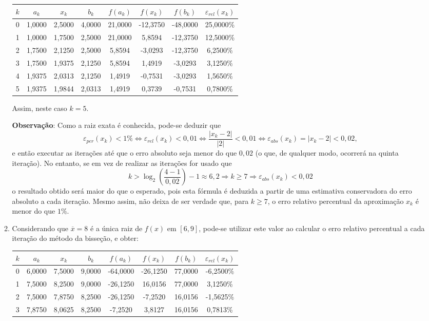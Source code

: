 \documentclass[12pt,a4paper]{article}
\begin{document}
\begin{enumerate}
\begin{enumerate}
\begin{tabular}{cccccccc}
\hline
$k$ & $a_k$ & $x_k$ & $b_k$ & $f(a_k)$ & $f(x_k)$ & $f(b_k)$ & $\varepsilon_{rel}(x_k)$ \\
\hline
0 & 1,0000 & 2,5000 & 4,0000 & 21,0000 & -12,3750 & -48,0000 & 25,0000\% \\
1 & 1,0000 & 1,7500 & 2,5000 & 21,0000 &   5,8594 & -12,3750 & 12,5000\%\\
2 & 1,7500 & 2,1250 & 2,5000 &  5,8594 &  -3,0293 & -12,3750 &  6,2500\%\\
3 & 1,7500 & 1,9375 & 2,1250 &  5,8594 &   1,4919 &  -3,0293 &  3,1250\%\\
4 & 1,9375 & 2,0313 & 2,1250 &  1,4919 &  -0,7531 &  -3,0293 &  1,5650\%\\
5 & 1,9375 & 1,9844 & 2,0313 &  1,4919 &   0,3739 &  -0,7531 &  0,7800\%\\
\hline
\end{tabular}

Assim, neste caso $k = 5$.

\textbf{Observação}: Como a raiz exata é conhecida, pode-se deduzir que
\[
\varepsilon_{per}(x_k) < 1\%
\Leftrightarrow
\varepsilon_{rel}(x_k) < 0,01
\Leftrightarrow
\frac{|x_k - 2|}{|2|} < 0,01
\Leftrightarrow
\varepsilon_{abs}(x_k) = |x_k - 2| < 0,02,
\]
e então executar as iterações até que o erro absoluto seja menor do que $0,02$ (o que, de qualquer modo, ocorrerá na quinta iteração). No entanto, se em vez de realizar as iterações for usado que
\[
k > \log_2 \left(\frac{4-1}{0,02}\right)-1 \approx 6,2
\Rightarrow
k \geq 7
\Rightarrow
\varepsilon_{abs}(x_k) < 0,02
\]
o resultado obtido será maior do que o esperado, pois esta fórmula é deduzida a partir de uma estimativa conservadora do erro absoluto a cada iteração. Mesmo assim, não deixa de ser verdade que, para $k\geq 7$, o erro relativo percentual da aproximação $x_k$ é menor do que $1\%$.

\item Considerando que $\overline{x} = 8$ é a única raiz de $f(x)$ em $[6, 9]$, pode-se utilizar este valor ao calcular o erro relativo percentual a cada iteração do método da bisseção, e obter:

\begin{tabular}{cccccccc}
\hline
$k$ & $a_k$ & $x_k$ & $b_k$ & $f(a_k)$ & $f(x_k)$ & $f(b_k)$ & $\varepsilon_{rel}(x_k)$ \\
\hline
0 & 6,0000 & 7,5000 & 9,0000 & -64,0000 & -26,1250 & 77,0000 & -6,2500\%\\
1 & 7,5000 & 8,2500 & 9,0000 & -26,1250 &  16,0156 & 77,0000 &  3,1250\%\\
2 & 7,5000 & 7,8750 & 8,2500 & -26,1250 &  -7,2520 & 16,0156 & -1,5625\%\\
3 & 7,8750 & 8,0625 & 8,2500 &  -7,2520 &   3,8127 & 16,0156 &  0,7813\%\\
\hline
\end{tabular}


\end{enumerate}
\end{enumerate}
\end{document}
